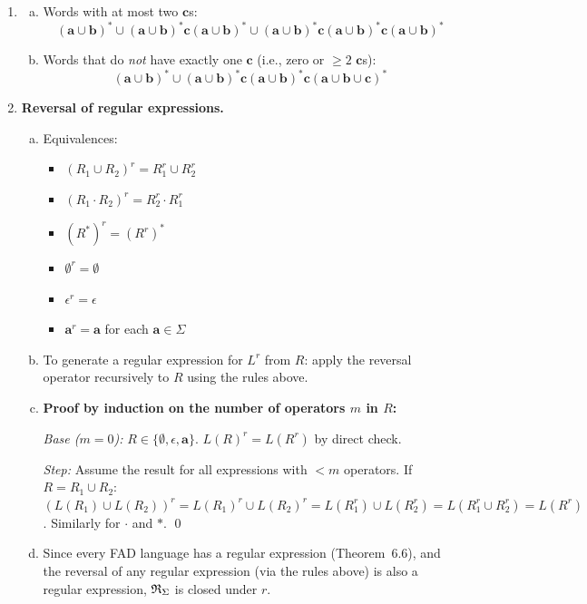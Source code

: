 \begin{enumerate}[{6.}1.]
\item \begin{enumerate}[(a)]
  \item Words with at most two $\pmb{c}$s:
  \[
    (\pmb{a}\cup\pmb{b})^*\cup(\pmb{a}\cup\pmb{b})^*\pmb{c}(\pmb{a}\cup\pmb{b})^*\cup(\pmb{a}\cup\pmb{b})^*\pmb{c}(\pmb{a}\cup\pmb{b})^*\pmb{c}(\pmb{a}\cup\pmb{b})^*
  \]

  \item Words that do \emph{not} have exactly one $\pmb{c}$ (i.e., zero or $\ge 2$ $\pmb{c}$s):
  \[
    (\pmb{a}\cup\pmb{b})^*
    \cup
    (\pmb{a}\cup\pmb{b})^*\pmb{c}(\pmb{a}\cup\pmb{b})^*\pmb{c}(\pmb{a}\cup\pmb{b}\cup\pmb{c})^*
  \]
\end{enumerate}

\item \textbf{Reversal of regular expressions.}

\begin{enumerate}[(a)]
  \item Equivalences:
  \begin{itemize}
    \item $(R_1\cup R_2)^r=R_1^r\cup R_2^r$
    \item $(R_1\cdot R_2)^r=R_2^r\cdot R_1^r$
    \item $(R^*)^r=(R^r)^*$
    \item $\emptyset^r=\emptyset$
    \item $\epsilon^r=\epsilon$
    \item $\pmb{a}^r=\pmb{a}$ for each $\pmb{a}\in\Sigma$
  \end{itemize}

  \item To generate a regular expression for $L^r$ from $R$: apply the reversal operator recursively to $R$ using the rules above.

  \item \textbf{Proof by induction on the number of operators $m$ in $R$:}

  \emph{Base ($m=0$):}  $R\in\{\emptyset,\epsilon,\pmb{a}\}$.  $L(R)^r=L(R^r)$ by direct check.

  \emph{Step:}  Assume the result for all expressions with $<m$ operators.  If $R=R_1\cup R_2$: $(L(R_1)\cup L(R_2))^r=L(R_1)^r\cup L(R_2)^r=L(R_1^r)\cup L(R_2^r)=L(R_1^r\cup R_2^r)=L(R^r)$.  Similarly for $\cdot$ and $*$.  \qed

  \item Since every FAD language has a regular expression (Theorem~6.6), and the reversal of any regular expression (via the rules above) is also a regular expression, $\mathfrak{R}_\Sigma$ is closed under $r$.
\end{enumerate}


\end{enumerate}
